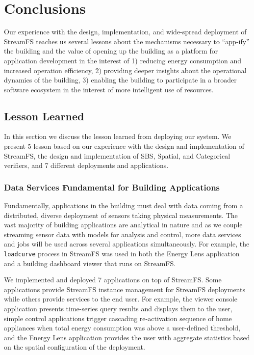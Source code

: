 
\chapter{Conclusions}
\label{chap:future}

Our experience with the design, implementation, and wide-spread deployment of StreamFS teaches us several lessons about
the mechanisms necessary to ``app-ify'' the building and the value of opening up the building as a platform for application 
development in the interest of 1) reducing energy consumption and increased operation efficiency, 2) providing deeper
insights about the operational dynamics of the building, 3) enabling the building to participate in a broader
software ecosystem in the interest of more intelligent use of resources. 

\section{Lesson Learned}
In this section we discuss the lesson learned from deploying our system.  We present 5 lesson based on our
experience with the design and implementation of StreamFS, the design and implementation of SBS, Spatial,
and Categorical verifiers, and 7 different deployments and applications.



\subsection{Data Services Fundamental for Building Applications}
Fundamentally, applications in the building must deal with data coming from a distributed, diverse deployment of sensors
taking physical measurements.  The vast majority of building applications are analytical in nature and as we couple
streaming sensor data with models for analysis and control, more data services and jobs will be used across 
several applications simultaneously.  For example, the \texttt{loadcurve} process in StreamFS was used in both 
the Energy Lens application and a building dashboard viewer that runs on StreamFS.

We implemented and deployed 7 applications on top of StreamFS.  Some applications provide StreamFS instance management 
for StreamFS deployments while others provide services to the end user.  For example, the viewer console application
 presents time-series query results 
and displays them to the user, simple control applications trigger cascading re-activation sequence of home appliances when total energy consumption
was above a user-defined threshold, and the Energy Lens application provides the user with aggregate statistics based on
the spatial configuration of the deployment.


